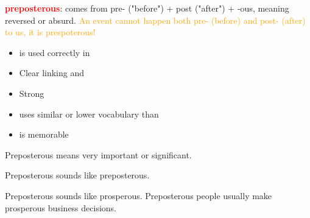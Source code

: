 \begin{figure*}[htb]
\centering
\footnotesize
\begin{minipage}{0.66\textwidth}
    \begin{tcolorbox}[goodbox, title=Good Mnemonic]
        \textcolor{red}{\textbf{preposterous}}: \textcolor{goodgreen}{comes from pre- ("before") + post ("after") + -ous}, meaning reversed or absurd. \textcolor{orange}{An event cannot happen both pre- (before) and post- (after) to us, it is prespoterous!}
    \end{tcolorbox}
\end{minipage}
\hspace{0.5em}
\begin{minipage}{0.3\textwidth}
    \begin{itemize}[leftmargin=*, nosep]
        \item \vocab is used correctly in \mnem
        \item Clear \assoc linking \vocab and \mnem
        \item Strong \assoc
        \item \mnem uses similar or lower vocabulary than \vocab
        \item \mnem is memorable
    \end{itemize}
\end{minipage}

\vspace{0.3cm}

\begin{minipage}{0.33\textwidth}
    \begin{tcolorbox}[badbox, title=Incorrect Definition]
        Preposterous means very important or significant.
    \end{tcolorbox}
\end{minipage}%
\begin{minipage}{0.33\textwidth}
    \begin{tcolorbox}[badbox, title=Circular Association]
        Preposterous sounds like preposterous.
    \end{tcolorbox}
\end{minipage}%
\begin{minipage}{0.33\textwidth}
    \begin{tcolorbox}[badbox, title=Weak Association]
        Preposterous sounds like prosperous. Preposterous people usually make prosperous business decisions.
    \end{tcolorbox}
\end{minipage}


\end{figure*}
